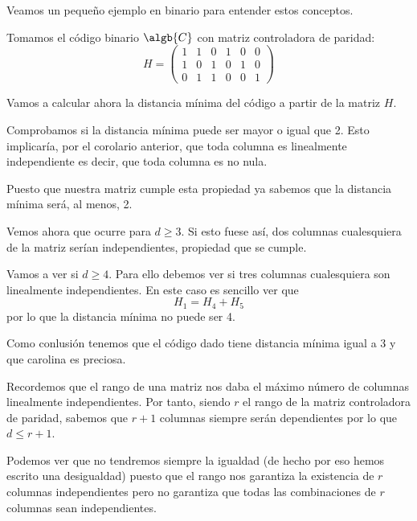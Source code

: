 Veamos un pequeño ejemplo en binario para entender estos conceptos.
\begin{example}
Tomamos el código binario $\algb{C}$ con matriz controladora de paridad:
\[H = \left(\begin{array}{cccccc}
1 & 1 & 0 & 1 & 0 & 0 \\
1 & 0 & 1 & 0 & 1 & 0\\
0 & 1 & 1 & 0 & 0 & 1
\end{array}\right) \]

Vamos a calcular ahora la distancia mínima del código a partir de la matriz $H$.

Comprobamos si la distancia mínima puede ser mayor o igual que 2. Esto implicaría, por el corolario anterior, que toda columna es linealmente independiente es decir, que toda columna es no nula.

Puesto que nuestra matriz cumple esta propiedad ya sabemos que la distancia mínima será, al menos, 2.

Vemos ahora que ocurre para $d\geq 3$. Si esto fuese así, dos columnas cualesquiera de la matriz serían independientes, propiedad que se cumple.

Vamos a ver si $d \geq 4$. Para ello debemos ver si tres columnas cualesquiera son linealmente independientes. En este caso es sencillo ver que
\[H_1=H_4+H_5\]
por lo que la distancia mínima no puede ser 4.

Como conlusión tenemos que el código dado tiene distancia mínima igual a 3 y que carolina es preciosa.
\end{example}

Recordemos que el rango de una matriz nos daba el máximo número de columnas linealmente independientes. Por tanto, siendo $r$ el rango de la matriz controladora de paridad, sabemos que $r+1$ columnas siempre serán dependientes por lo que $d\leq r+1$.

Podemos ver que no tendremos siempre la igualdad (de hecho por eso hemos escrito una desigualdad) puesto que el rango nos garantiza la existencia de $r$ columnas independientes pero no garantiza que todas las combinaciones de $r$ columnas sean independientes.

